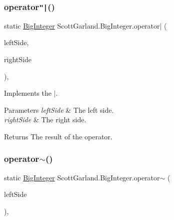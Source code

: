 \subsubsection{\texorpdfstring{operator\texttt{"|}()}{operator|()}}
{\footnotesize\ttfamily static \hyperlink{class_scott_garland_1_1_big_integer}{Big\+Integer} Scott\+Garland.\+Big\+Integer.\+operator$\vert$ (\begin{DoxyParamCaption}\item[{\hyperlink{class_scott_garland_1_1_big_integer}{Big\+Integer}}]{left\+Side,  }\item[{\hyperlink{class_scott_garland_1_1_big_integer}{Big\+Integer}}]{right\+Side }\end{DoxyParamCaption})\hspace{0.3cm}{\ttfamily [inline]}, {\ttfamily [static]}}



Implements the $\vert$. 


\begin{DoxyParams}{Parameters}
{\em left\+Side} & The left side.\\
\hline
{\em right\+Side} & The right side.\\
\hline
\end{DoxyParams}
\begin{DoxyReturn}{Returns}
The result of the operator.
\end{DoxyReturn}
\mbox{\label{class_scott_garland_1_1_big_integer_a1028f3352a4a6558c1cd8f9048068337}} 
\subsubsection{\texorpdfstring{operator$\sim$()}{operator~()}}
{\footnotesize\ttfamily static \hyperlink{class_scott_garland_1_1_big_integer}{Big\+Integer} Scott\+Garland.\+Big\+Integer.\+operator$\sim$ (\begin{DoxyParamCaption}\item[{\hyperlink{class_scott_garland_1_1_big_integer}{Big\+Integer}}]{left\+Side }\end{DoxyParamCaption})\hspace{0.3cm}{\ttfamily [inline]}, {\ttfamily [static]}}



